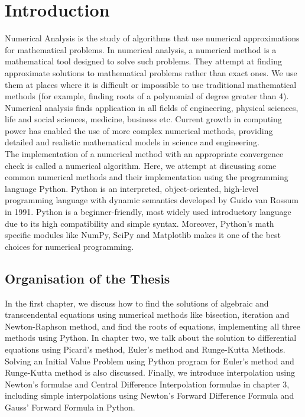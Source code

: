 \documentclass[12pt,a4paper,oneside]{book}
\begin{document}
\newpage
\tableofcontents
\frontmatter
{}
\chapter{Introduction}



\noindent Numerical Analysis is the study of algorithms that use numerical approximations for mathematical problems. In numerical analysis, a numerical method
is a mathematical tool designed to solve such problems. They attempt at finding approximate solutions to mathematical problems rather
than exact ones. We use them at places where it is difficult or impossible to use traditional mathematical methods (for example, finding roots of a polynomial
of degree greater than 4). Numerical analysis finds application in all fields of engineering, physical sciences, life and social sciences, medicine, business etc. Current growth in computing power has enabled the use of more complex numerical methods, providing detailed and realistic mathematical models in science and engineering. \\
The implementation of a numerical method with an appropriate convergence check is called a numerical algorithm. Here, we attempt at discussing some common numerical methods and their implementation using the programming language Python. Python is an interpreted, object-oriented, high-level programming language with dynamic semantics developed by Guido van Rossum in 1991. Python is a beginner-friendly, most widely used introductory language due to its high compatibility and simple syntax. Moreover, Python's math specific modules like NumPy, SciPy and Matplotlib makes it one of the best choices for numerical programming.

\section{Organisation of the Thesis}
In the first chapter, we discuss how to find the solutions of algebraic and transcendental equations using numerical methods like bisection, iteration and Newton-Raphson method, and  find the roots of equations, implementing all three methods using Python. In chapter two, we talk about the solution to differential equations using Picard’s method, Euler's method and Runge-Kutta Methods. Solving an Initial Value Problem using Python program for Euler's method and Runge-Kutta method is also discussed. Finally, we introduce interpolation using Newton's formulae and Central Difference Interpolation formulae in chapter 3, including simple interpolations using Newton's Forward Difference Formula and Gauss' Forward Formula in Python.
\end{document}

